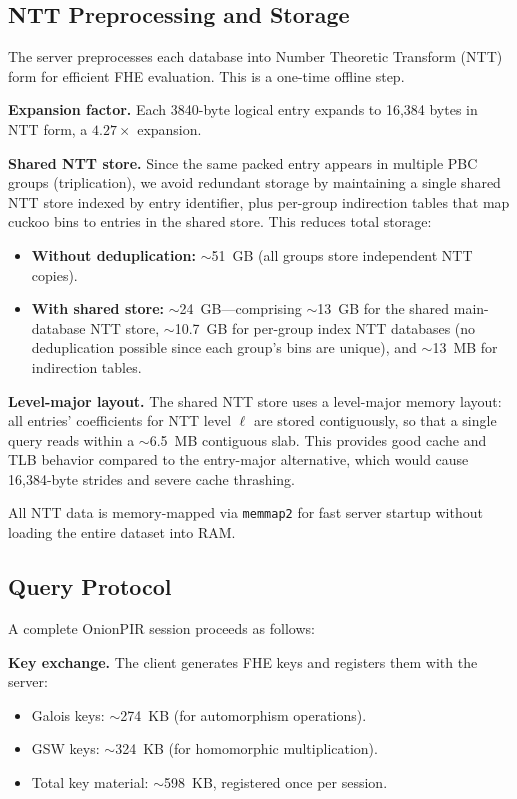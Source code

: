\subsection{NTT Preprocessing and Storage}
\label{sec:onion-ntt}

The server preprocesses each database into Number Theoretic Transform (NTT) form for efficient FHE evaluation. This is a one-time offline step.

\textbf{Expansion factor.} Each 3840-byte logical entry expands to 16,384 bytes in NTT form, a $4.27\times$ expansion.

\textbf{Shared NTT store.} Since the same packed entry appears in multiple PBC groups (triplication), we avoid redundant storage by maintaining a single shared NTT store indexed by entry identifier, plus per-group indirection tables that map cuckoo bins to entries in the shared store. This reduces total storage:
\begin{itemize}[nolistsep,leftmargin=*]
    \item \textbf{Without deduplication:} $\sim$51~GB (all groups store independent NTT copies).
    \item \textbf{With shared store:} $\sim$24~GB---comprising $\sim$13~GB for the shared main-database NTT store, $\sim$10.7~GB for per-group index NTT databases (no deduplication possible since each group's bins are unique), and $\sim$13~MB for indirection tables.
\end{itemize}

\textbf{Level-major layout.} The shared NTT store uses a level-major memory layout: all entries' coefficients for NTT level $\ell$ are stored contiguously, so that a single query reads within a $\sim$6.5~MB contiguous slab. This provides good cache and TLB behavior compared to the entry-major alternative, which would cause 16,384-byte strides and severe cache thrashing.

All NTT data is memory-mapped via \texttt{memmap2} for fast server startup without loading the entire dataset into RAM.

\subsection{Query Protocol}
\label{sec:onion-query}

A complete OnionPIR session proceeds as follows:

\textbf{Key exchange.} The client generates FHE keys and registers them with the server:
\begin{itemize}[nolistsep,leftmargin=*]
    \item Galois keys: $\sim$274~KB (for automorphism operations).
    \item GSW keys: $\sim$324~KB (for homomorphic multiplication).
    \item Total key material: $\sim$598~KB, registered once per session.
\end{itemize}

